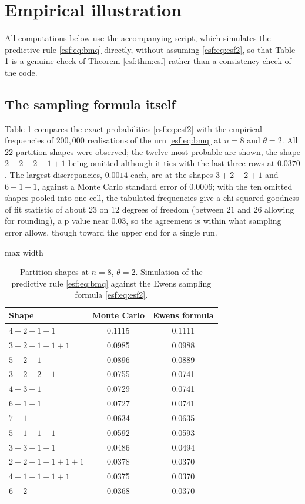 \section{Empirical illustration}
\label{esf:sec:empirical}

All computations below use the accompanying script, which simulates the predictive
rule \eqref{esf:eq:bmq} directly, without assuming \eqref{esf:eq:esf2}, so that Table
\ref{esf:tab:esf} is a genuine check of Theorem \ref{esf:thm:esf} rather than a consistency
check of the code.

\subsection{The sampling formula itself}

Table \ref{esf:tab:esf} compares the exact probabilities \eqref{esf:eq:esf2} with the
empirical frequencies of $200{,}000$ realisations of the urn \eqref{esf:eq:bmq} at
$n = 8$ and $\theta = 2$. All $22$ partition shapes were observed; the twelve most
probable are shown, the shape $2+2+2+1+1$ being omitted although it ties with the last
three rows at $0.0370$. The largest discrepancies, $0.0014$ each, are at the shapes $3+2+2+1$ and $6+1+1$, against a Monte Carlo standard error of $0.0006$; with the ten omitted shapes pooled into one cell, the tabulated frequencies give a chi squared goodness of fit statistic of about $23$ on $12$ degrees of freedom (between $21$ and $26$ allowing for rounding), a p value near $0.03$, so the agreement is within what sampling error allows, though toward the upper end for a single run.

\begin{table}[htbp]
\centering
\caption{Partition shapes at $n=8$, $\theta = 2$. Simulation of the predictive rule
\eqref{esf:eq:bmq} against the Ewens sampling formula \eqref{esf:eq:esf2}.}
\label{esf:tab:esf}
\begin{adjustbox}{max width=\textwidth}
\begin{tabular}{lcc}
\toprule
Shape & Monte Carlo & Ewens formula \\
\midrule
$4+2+1+1$      & 0.1115 & 0.1111 \\
$3+2+1+1+1$    & 0.0985 & 0.0988 \\
$5+2+1$        & 0.0896 & 0.0889 \\
$3+2+2+1$      & 0.0755 & 0.0741 \\
$4+3+1$        & 0.0729 & 0.0741 \\
$6+1+1$        & 0.0727 & 0.0741 \\
$7+1$          & 0.0634 & 0.0635 \\
$5+1+1+1$      & 0.0592 & 0.0593 \\
$3+3+1+1$      & 0.0486 & 0.0494 \\
$2+2+1+1+1+1$  & 0.0378 & 0.0370 \\
$4+1+1+1+1$    & 0.0375 & 0.0370 \\
$6+2$          & 0.0368 & 0.0370 \\
\bottomrule
\end{tabular}
\end{adjustbox}
\end{table}

